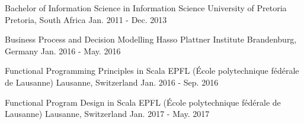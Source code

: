   \begin{cventries}
    \cventry{}{}{}{}{}
    
    \cventry
      {Bachelor of Information Science in Information Science} %
      {University of Pretoria} %
      {Pretoria, South Africa} %
      {Jan. 2011 - Dec. 2013} %
      {}

    \cventry
      {Business Process and Decision Modelling} %
      {Hasso Plattner Institute} %
      {Brandenburg, Germany} %
      {Jan. 2016 - May. 2016} %
      {}

    \cventry
      {Functional Programming Principles in Scala} %
      {EPFL (École polytechnique fédérale de Lausanne)} %
      {Lausanne, Switzerland} %
      {Jan. 2016 - Sep. 2016} %
      {}

    \cventry
      {Functional Program Design in Scala} %
      {EPFL (École polytechnique fédérale de Lausanne)} %
      {Lausanne, Switzerland} %
      {Jan. 2017 - May. 2017} %
      {}
  \end{cventries}